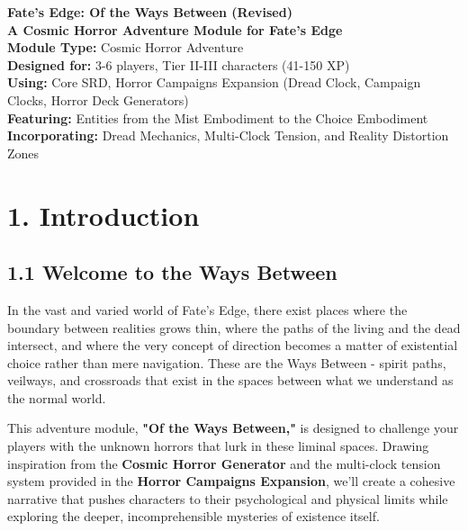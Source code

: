 \documentclass[11pt]{article}
\begin{document}
\begin{center}
{\LARGE \textbf{Fate's Edge: Of the Ways Between (Revised)}}\\[1em]
{\large \textbf{A Cosmic Horror Adventure Module for Fate's Edge}}\\[2em]

\textbf{Module Type:} Cosmic Horror Adventure\\
\textbf{Designed for:} 3-6 players, Tier II-III characters (41-150 XP)\\
\textbf{Using:} Core SRD, Horror Campaigns Expansion (Dread Clock, Campaign Clocks, Horror Deck Generators)\\
\textbf{Featuring:} Entities from the Mist Embodiment to the Choice Embodiment\\
\textbf{Incorporating:} Dread Mechanics, Multi-Clock Tension, and Reality Distortion Zones
\end{center}

\clearpage

\tableofcontents

\clearpage

\section*{1. Introduction}

\subsection*{1.1 Welcome to the Ways Between}

In the vast and varied world of Fate's Edge, there exist places where the boundary between realities grows thin, where the paths of the living and the dead intersect, and where the very concept of direction becomes a matter of existential choice rather than mere navigation. These are the Ways Between - spirit paths, veilways, and crossroads that exist in the spaces between what we understand as the normal world.

This adventure module, \textbf{"Of the Ways Between,"} is designed to challenge your players with the unknown horrors that lurk in these liminal spaces. Drawing inspiration from the \textbf{Cosmic Horror Generator} and the multi-clock tension system provided in the \textbf{Horror Campaigns Expansion}, we'll create a cohesive narrative that pushes characters to their psychological and physical limits while exploring the deeper, incomprehensible mysteries of existence itself.
\end{document}
